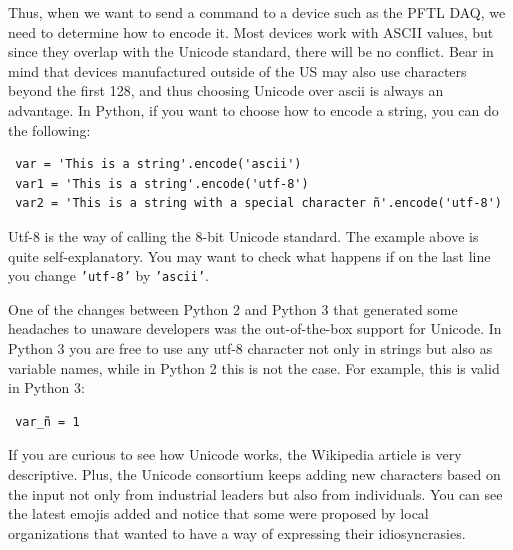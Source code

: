 Thus, when we want to send a command to a device such as the {PFTL DAQ}, we need to determine how to encode it. Most devices work with ASCII values, but since they overlap with the 
Unicode standard, there will be no conflict. Bear in mind that devices manufactured outside of the US may also use characters beyond the first 128, and thus choosing Unicode over ascii is always an advantage. In Python, if you want 
to choose how to encode a string, you can do the following:

\begin{verbatim}
 var = 'This is a string'.encode('ascii')
 var1 = 'This is a string'.encode('utf-8')
 var2 = 'This is a string with a special character ñ'.encode('utf-8')
\end{verbatim}

Utf-8 is the way of calling the 8-bit Unicode standard. The example above is quite self-explanatory. You may want to check what happens if on the last line you change \texttt{'utf-8'} by \texttt{'ascii'}. 

One of the changes between Python 2 and Python 3 that generated some headaches 
to unaware developers was the out-of-the-box support for Unicode. In Python 3 
you are free to use any utf-8 character not only in strings but also as 
variable names, while in Python 2 this is not the case. For example, this is 
valid in Python 3:

\begin{verbatim}
 var_ñ = 1
\end{verbatim}

If you are curious to see how Unicode works, the Wikipedia article is very descriptive. Plus, the Unicode consortium keeps adding new characters based on the input not only from industrial leaders but also from individuals. You can see the latest emojis added and notice that some were proposed by local organizations that wanted to have a way of expressing their idiosyncrasies. 
